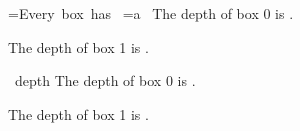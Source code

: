 =\hbox{Every box has }
=\hbox{a }
The depth of box 0 is \the{}.\par
The depth of box 1 is \the{}.\par
\hbox{ depth}
The depth of box 0 is \the{}.\par
The depth of box 1 is \the{}.\par
\bye
